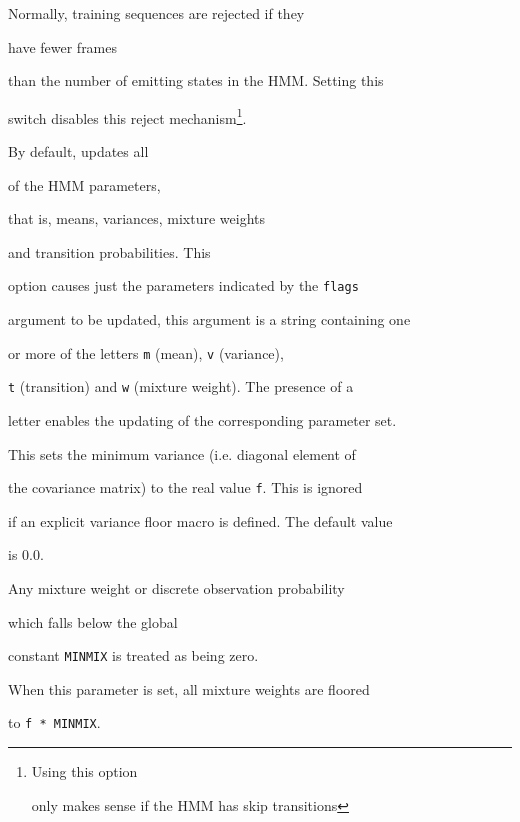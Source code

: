 \begin{optlist}
    Normally, training sequences are rejected if they


      have fewer frames


      than the number of emitting states in the HMM.  Setting this


      switch disables this reject mechanism\footnote{Using this option


      only makes sense if the HMM has skip transitions}.


      


    By default,  updates all 


      of the HMM parameters,


      that is, means, variances, mixture weights


      and transition probabilities. This 


      option causes just the parameters indicated by the {\tt flags}


      argument to be updated, this argument is a string containing one


      or more of the letters {\tt m} (mean), {\tt v} (variance), 


      {\tt t} (transition) and {\tt w} (mixture weight).  The presence of a


      letter enables the updating of the corresponding parameter set.





    This sets the minimum variance (i.e. diagonal element of


      the covariance matrix) to the real value {\tt f}.  This is ignored


      if an explicit variance floor macro is defined. The default value


      is 0.0.


      


    Any mixture weight or discrete observation probability


      which falls below the global


            constant {\tt MINMIX} is treated as being zero.


      When this parameter is  set,  all mixture weights  are floored


      to {\tt f * MINMIX}.





\stdoptB


\stdoptF


\stdoptG


\stdoptH


\stdoptI


\stdoptL


\stdoptM


\stdoptX





\end{optlist}


